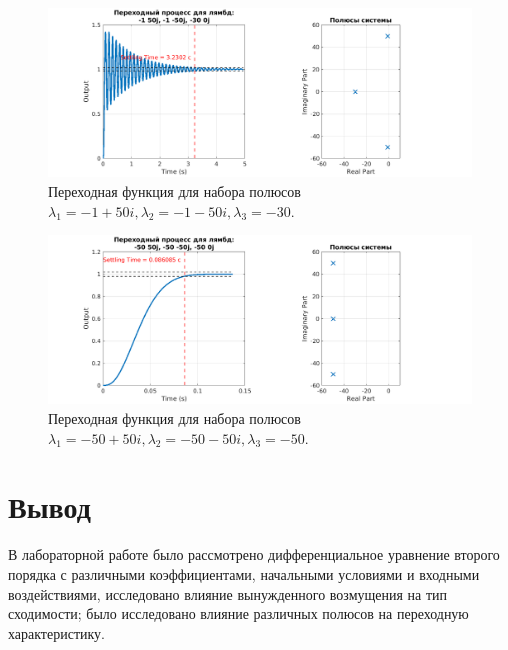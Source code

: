 \begin{figure}
    \centering
    \includegraphics[width=1\textwidth]{figs/task_2_out_9.png}
    \caption{Переходная функция для набора полюсов $\lambda_1 = -1+50i, \lambda_2 = -1 - 50i, \lambda_3 = -30$.}
    \label{fig:task_2_out_9}
\end{figure}

\begin{figure}
    \centering
    \includegraphics[width=1\textwidth]{figs/task_2_out_10.png}
    \caption{Переходная функция для набора полюсов $\lambda_1 = -50+50i, \lambda_2 = -50 - 50i, \lambda_3 = -50$.}
    \label{fig:task_2_out_10}
\end{figure}



\section*{Вывод}

В лабораторной работе было рассмотрено дифференциальное уравнение второго порядка с
различными коэффициентами, начальными условиями и входными воздействиями, исследовано
влияние вынужденного возмущения на тип сходимости; было исследовано влияние различных
полюсов на переходную характеристику.